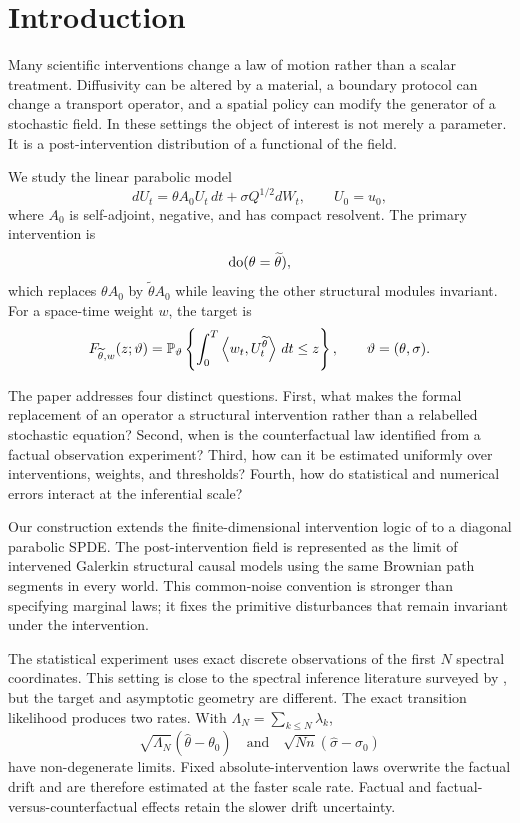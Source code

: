 \section{Introduction}

Many scientific interventions change a law of motion rather than a scalar treatment. Diffusivity can be altered by a material, a boundary protocol can change a transport operator, and a spatial policy can modify the generator of a stochastic field. In these settings the object of interest is not merely a parameter. It is a post-intervention distribution of a functional of the field.

We study the linear parabolic model
\begin{equation}\label{eq:intro-spde}
 dU_t=\theta A_0U_t\,dt+\sigma Q^{1/2}dW_t,
 \qquad U_0=u_0,
\end{equation}
where $A_0$ is self-adjoint, negative, and has compact resolvent. The primary intervention is
\[
 \operatorname{do}(\theta=\widetilde\theta),
\]
which replaces $\theta A_0$ by $\widetilde\theta A_0$ while leaving the other structural modules invariant. For a space-time weight $w$, the target is
\begin{equation}\label{eq:intro-target}
 F_{\widetilde\theta,w}(z;\vartheta)
 =\mathbb P_{\vartheta}\left\{
 \int_0^T\left\langle w_t,U_t^{\widetilde\theta}\right\rangle\,dt\le z
 \right\},
 \qquad \vartheta=(\theta,\sigma).
\end{equation}

The paper addresses four distinct questions. First, what makes the formal replacement of an operator a structural intervention rather than a relabelled stochastic equation? Second, when is the counterfactual law identified from a factual observation experiment? Third, how can it be estimated uniformly over interventions, weights, and thresholds? Fourth, how do statistical and numerical errors interact at the inferential scale?

Our construction extends the finite-dimensional intervention logic of \citet{SokolHansen2014} to a diagonal parabolic SPDE. The post-intervention field is represented as the limit of intervened Galerkin structural causal models using the same Brownian path segments in every world. This common-noise convention is stronger than specifying marginal laws; it fixes the primitive disturbances that remain invariant under the intervention.

The statistical experiment uses exact discrete observations of the first $N$ spectral coordinates. This setting is close to the spectral inference literature surveyed by \citet{Cialenco2018}, but the target and asymptotic geometry are different. The exact transition likelihood produces two rates. With $\Lambda_N=\sum_{k\le N}\lambda_k$,
\[
 \sqrt{\Lambda_N}(\widehat\theta-\theta_0)
 \quad\text{and}\quad
 \sqrt{Nn}(\widehat\sigma-\sigma_0)
\]
have non-degenerate limits. Fixed absolute-intervention laws overwrite the factual drift and are therefore estimated at the faster scale rate. Factual and factual-versus-counterfactual effects retain the slower drift uncertainty.

